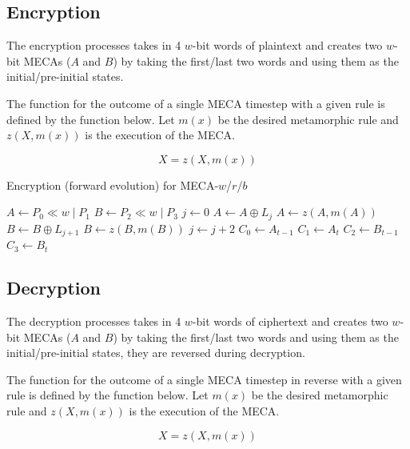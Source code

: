 \documentclass{article}
\begin{document}
\subsection{Encryption}

The encryption processes takes in 4 $w$-bit words of plaintext and creates two $w$-bit MECAs ($A$ and $B$) by taking the first/last two words and using them as the initial/pre-initial states.

The function for the outcome of a single MECA timestep with a given rule is defined by the function below. Let $m(x)$ be the desired metamorphic rule and $z(X, m(x))$ is the execution of the MECA.

$$
	X = z(X, m(x)) 
$$

\begin{algorithm}[H]
  \begin{algorithmic}
    \caption{Encryption (forward evolution) for MECA-$w$/$r$/$b$}\label{alg:encryption}
    \Input
    \EndInput
    \Output
    \EndOutput
    \State $A \gets P_0 \ll w \mathbin{|}  P_1$
	\State $B \gets P_2 \ll w \mathbin{|}  P_3$
	\State $j \gets 0$
		\State $A \gets A \oplus L_j$
		\State $A \gets z(A, m(A))$
		\State $B \gets B \oplus L_{j+1}$
		\State $B \gets z(B, m(B))$
		\State $j \gets j + 2$
    \EndFor
    \State $C_0 \gets A_{t-1}$
    \State $C_1 \gets A_{t}$
    \State $C_2 \gets B_{t-1}$
    \State $C_3 \gets B_{t}$
  \end{algorithmic}
\end{algorithm}

\subsection{Decryption}

The decryption processes takes in 4 $w$-bit words of ciphertext and creates two $w$-bit MECAs ($A$ and $B$) by taking the first/last two words and using them as the initial/pre-initial states, they are reversed during decryption.

The function for the outcome of a single MECA timestep in reverse with a given rule is defined by the function below. Let $m(x)$ be the desired metamorphic rule and $z(X, m(x))$ is the execution of the MECA.

$$
	X = z(X, m(x)) 
$$
\end{document}
